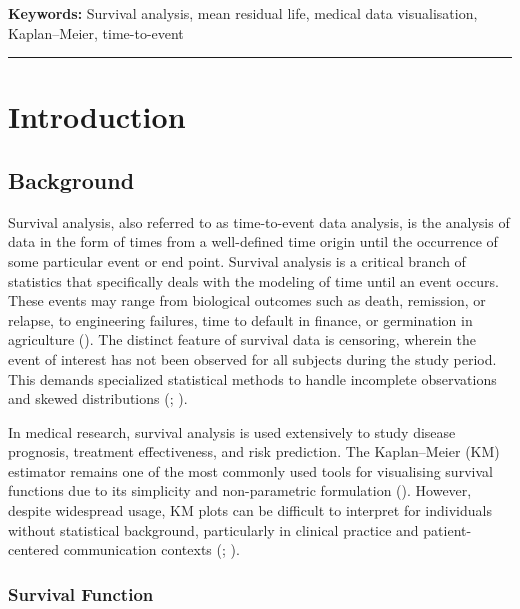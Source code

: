 \documentclass[
  onecolumn]{article}
\begin{document}
\textbf{Keywords:} Survival analysis, mean residual life, medical data
visualisation, Kaplan--Meier, time-to-event

\noindent

\rule{\linewidth}{0.4pt}

\section{Introduction}\label{introduction}

\subsection{Background}\label{background}

Survival analysis, also referred to as time-to-event data analysis, is
the analysis of data in the form of times from a well-defined time
origin until the occurrence of some particular event or end point.
Survival analysis is a critical branch of statistics that specifically
deals with the modeling of time until an event occurs. These events may
range from biological outcomes such as death, remission, or relapse, to
engineering failures, time to default in finance, or germination in
agriculture (\citet{peaceDesignAnalysisClinical2009}). The distinct
feature of survival data is censoring, wherein the event of interest has
not been observed for all subjects during the study period. This demands
specialized statistical methods to handle incomplete observations and
skewed distributions (\citet{collettModellingSurvivalData2023};
\citet{bradburnSurvivalAnalysisPart2003}).

In medical research, survival analysis is used extensively to study
disease prognosis, treatment effectiveness, and risk prediction. The
Kaplan--Meier (KM) estimator remains one of the most commonly used tools
for visualising survival functions due to its simplicity and
non-parametric formulation
(\citet{kleinSurvivalAnalysisTechniques2006}). However, despite
widespread usage, KM plots can be difficult to interpret for individuals
without statistical background, particularly in clinical practice and
patient-centered communication contexts
(\citet{hawkinsCosteffectivenessAnalysisTreatments2005};
\citet{trevenaPresentingQuantitativeInformation2013}).

\subsubsection{Survival Function}\label{survival-function}
\end{document}

